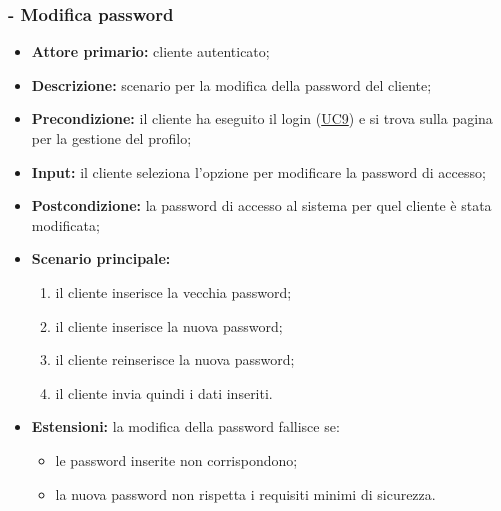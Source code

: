 \subsubsection{ - Modifica password}
\begin{itemize}
    \item \textbf{Attore primario:} cliente autenticato;
    \item \textbf{Descrizione:} scenario per la modifica della password del cliente;
    \item \textbf{Precondizione:} il cliente ha eseguito il login (\hyperref[UC9]{UC9}) e si trova sulla pagina per la gestione del profilo;
    \item \textbf{Input:} il cliente seleziona l'opzione per modificare la password di accesso;
    \item \textbf{Postcondizione:} la password di accesso al sistema per quel cliente è stata modificata;
    \item \textbf{Scenario principale:}
          \begin{enumerate}
              \item il cliente inserisce la vecchia password;
              \item il cliente inserisce la nuova password;
              \item il cliente reinserisce la nuova password;
              \item il cliente invia quindi i dati inseriti.
          \end{enumerate}
    \item \textbf{Estensioni:} la modifica della password fallisce se:
          \begin{itemize}
              \item le password inserite non corrispondono;
              \item la nuova password non rispetta i requisiti minimi di sicurezza.
          \end{itemize}
\end{itemize}

\stepUserCase
